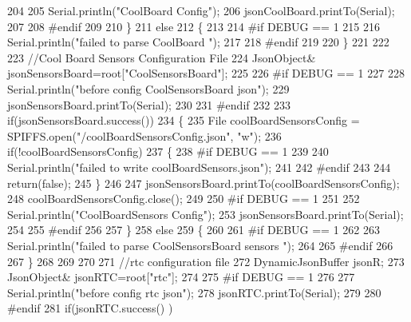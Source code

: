 \begin{DoxyCode}
204 
205         Serial.println(\textcolor{stringliteral}{"CoolBoard Config"});
206         jsonCoolBoard.printTo(Serial);
207     
208 \textcolor{preprocessor}{    #endif}
209         
210     \}
211     \textcolor{keywordflow}{else}
212     \{
213     
214 \textcolor{preprocessor}{    #if DEBUG == 1 }
215 
216         Serial.println(\textcolor{stringliteral}{"failed to parse CoolBoard "});
217     
218 \textcolor{preprocessor}{    #endif}
219 
220     \}       
221 
222     
223     \textcolor{comment}{//Cool Board Sensors Configuration File}
224         JsonObject& jsonSensorsBoard=root[\textcolor{stringliteral}{"CoolSensorsBoard"}];
225 
226 \textcolor{preprocessor}{#if DEBUG == 1 }
227 
228     Serial.println(\textcolor{stringliteral}{"before config CoolSensorsBoard json"});
229     jsonSensorsBoard.printTo(Serial);
230 
231 \textcolor{preprocessor}{#endif }
232     
233     \textcolor{keywordflow}{if}(jsonSensorsBoard.success())
234     \{   
235         File coolBoardSensorsConfig = SPIFFS.open(\textcolor{stringliteral}{"/coolBoardSensorsConfig.json"}, \textcolor{stringliteral}{"w"}); 
236         \textcolor{keywordflow}{if}(!coolBoardSensorsConfig)
237         \{
238 \textcolor{preprocessor}{        #if DEBUG == 1 }
239         
240             Serial.println(\textcolor{stringliteral}{"failed to write coolBoardSensors.json"});
241 
242 \textcolor{preprocessor}{        #endif}
243 
244             \textcolor{keywordflow}{return}(\textcolor{keyword}{false});
245         \}
246         
247         jsonSensorsBoard.printTo(coolBoardSensorsConfig);
248         coolBoardSensorsConfig.close();
249 
250 \textcolor{preprocessor}{    #if DEBUG == 1}
251 
252         Serial.println(\textcolor{stringliteral}{"CoolBoardSensors Config"});
253         jsonSensorsBoard.printTo(Serial);
254 
255 \textcolor{preprocessor}{    #endif}
256 
257     \}
258     \textcolor{keywordflow}{else}
259     \{
260 
261 \textcolor{preprocessor}{    #if DEBUG == 1}
262 
263         Serial.println(\textcolor{stringliteral}{"failed to parse CoolSensorsBoard sensors "});    
264     
265 \textcolor{preprocessor}{    #endif}
266 
267     \}
268     
269     
270     
271     \textcolor{comment}{//rtc configuration file}
272     DynamicJsonBuffer jsonR;
273         JsonObject& jsonRTC=root[\textcolor{stringliteral}{"rtc"}];
274 
275 \textcolor{preprocessor}{#if DEBUG == 1 }
276     
277     Serial.println(\textcolor{stringliteral}{"before config rtc json"});
278     jsonRTC.printTo(Serial);
279 
280 \textcolor{preprocessor}{#endif}
281     \textcolor{keywordflow}{if}(jsonRTC.success() )

\end{DoxyCode}

